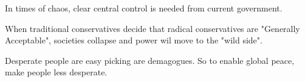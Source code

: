 \documentclass[letterpaper]{article}
\begin{document}
In times of chaos, clear central control is needed from current
government.

When traditional conservatives decide that radical conservatives are
"Generally Acceptable", societies collapse and power wil move to the
"wild side".

Desperate people are easy picking are demagogues. So to enable global
peace, make people less desperate.
\end{document}
